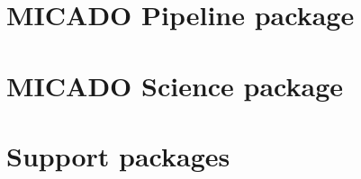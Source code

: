 \documentclass[a4paper,twoside,11pt]{report}
\begin{document}


\chapter{MICADO Pipeline package}









\chapter{MICADO Science package}
















\chapter{Support packages}





\end{document}
